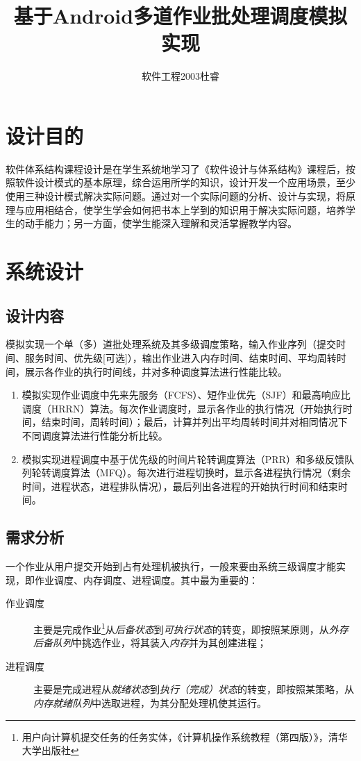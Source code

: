\documentclass[12pt, a4paper, UTF8]{ctexart}
\title{基于Android多道作业批处理调度模拟实现}
\author{软件工程2003杜睿}
\date{}
\begin{document}
\tableofcontents
\maketitle

\section{设计目的}
软件体系结构课程设计是在学生系统地学习了《软件设计与体系结构》课程后，按照软件设计模式的基本原理，综合运用所学的知识，设计开发一个应用场景，至少使用三种设计模式解决实际问题。通过对一个实际问题的分析、设计与实现，将原理与应用相结合，使学生学会如何把书本上学到的知识用于解决实际问题，培养学生的动手能力；另一方面，使学生能深入理解和灵活掌握教学内容。

\section{系统设计}

\subsection{设计内容}

模拟实现一个单（多）道批处理系统及其多级调度策略，输入作业序列（提交时间、服务时间、优先级[可选]），输出作业进入内存时间、结束时间、平均周转时间，展示各作业的执行时间线，并对多种调度算法进行性能比较。

\begin{enumerate}
    \item 模拟实现作业调度中先来先服务（FCFS）、短作业优先（SJF）和最高响应比调度（HRRN）算法。每次作业调度时，显示各作业的执行情况（开始执行时间，结束时间，周转时间）；最后，计算并列出平均周转时间并对相同情况下不同调度算法进行性能分析比较。
    \item 模拟实现进程调度中基于优先级的时间片轮转调度算法（PRR）和多级反馈队列轮转调度算法（MFQ）。每次进行进程切换时，显示各进程执行情况（剩余时间，进程状态，进程排队情况），最后列出各进程的开始执行时间和结束时间。
\end{enumerate}

\subsection{需求分析}

一个作业从用户提交开始到占有处理机被执行，一般来要由系统三级调度才能实现，即作业调度、内存调度、进程调度。其中最为重要的：
\begin{description}
    \item[作业调度] 主要是完成作业\footnote{用户向计算机提交任务的任务实体，《计算机操作系统教程（第四版）》，清华大学出版社}从\emph{后备状态}到\emph{可执行状态}的转变，即按照某原则，从\emph{外存后备队列}中挑选作业，将其装入\emph{内存}并为其创建进程；
    \item[进程调度] 主要是完成进程从\emph{就绪状态}到\emph{执行（完成）状态}的转变，即按照某策略，从\emph{内存就绪队列}中选取进程，为其分配处理机使其运行。
\end{description}
\end{document}
